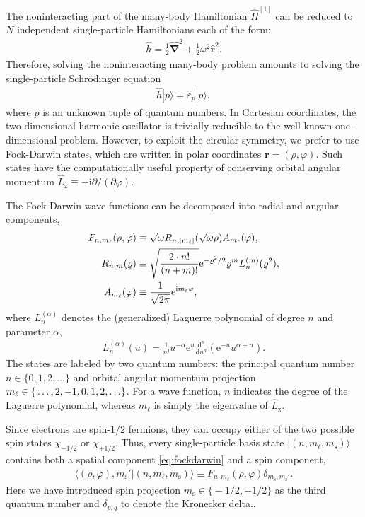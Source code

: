 The noninteracting part of the many-body Hamiltonian $\hat{H}^{[1]}$ can be reduced to $N$ independent single-particle Hamiltonians each of the form:
\begin{align*}
  \hat{h} = \frac{1}{2} \hat{\bm{\nabla}}^2 + \frac{1}{2} \omega^2 \hat{\bm{r}}^2.
\end{align*}
Therefore, solving the noninteracting many-body problem amounts to solving the single-particle Schr\"odinger equation
\begin{align*}
  \hat{h} |p\rangle = \varepsilon_p |p\rangle,
\end{align*}
where $p$ is an unknown tuple of quantum numbers.  In Cartesian
coordinates, the two-dimensional harmonic oscillator is trivially
reducible to the well-known one-dimensional problem.  However, to
exploit the circular symmetry, we prefer to use Fock-Darwin states,
which are written in polar coordinates $\bm{r} = (\rho, \varphi)$.
Such states have the computationally useful property of conserving
orbital angular momentum $\hat{L}_{\mathrm{z}} \equiv
-\mathrm{i} \partial / (\partial \varphi)$.

The Fock-Darwin wave functions can be decomposed into radial and
angular components,\cite{lohne2010coupled}
\begin{align}
  F_{n, m_\ell}(\rho, \varphi) &\equiv \sqrt\omega R_{n,
  |m_\ell|}(\sqrt \omega \rho)
  A_{m_\ell}(\varphi) \label{eq:fockdarwin}, \\ R_{n, m}(\varrho)
  &\equiv \sqrt{\frac{2 \cdot n!}{(n + m)!}} \mathrm{e}^{-\varrho^2 /
  2} \varrho^m L_n^{(m)}(\varrho^2), \notag \\ A_{m_\ell}(\varphi)
  &\equiv \frac{1}{\sqrt{2 \pi}} \mathrm{e}^{\mathrm{i}
  m_\ell \varphi}, \notag
\end{align}
where $L_n^{(\alpha)}$ denotes the (generalized) Laguerre
polynomial \cite{NIST:DLMF} of degree $n$ and parameter $\alpha$,
\begin{align*}
  L_n^{(\alpha)}(u) = \frac{1}{n!} u^{-\alpha} \mathrm{e}^u \frac{\mathrm{d}^n}{\mathrm{d} u^n} (\mathrm{e}^{-u} u^{\alpha + n}).
\end{align*}
The states are labeled by two quantum numbers: the principal quantum
number $n \in \{0, 1, 2, \ldots\}$ and orbital angular momentum
projection $m_\ell \in \mathbb \{\ldots, 2, -1, 0, 1, 2, \ldots\}$.
For a wave function, $n$ indicates the degree of the Laguerre
polynomial, whereas $m_\ell$ is simply the eigenvalue of
$\hat{L}_{\mathrm{z}}$.

Since electrons are spin-$1/2$ fermions, they can occupy either of the
two possible spin states $\chi_{-1/2}$ or $\chi_{+1/2}$.  Thus, every
single-particle basis state $| (n, m_\ell, m_{\mathrm{s}}) \rangle$
contains both a spatial component \eqref{eq:fockdarwin} and a spin
component,
\begin{align} \label{eq:singleparticlestate}
  \langle (\rho, \varphi), m_{\mathrm{s}}' | (n, m_\ell,
  m_{\mathrm{s}}) \rangle \equiv F_{n,
  m_\ell}(\rho, \varphi) \delta_{m_{\mathrm{s}}^{}, m_{\mathrm{s}}'}.
\end{align}
Here we have introduced spin projection $m_{\mathrm{s}} \in \bigl\{-1/2, +1/2\bigr\}$ as the third quantum number and $\delta_{p, q}$ to denote the Kronecker delta..

